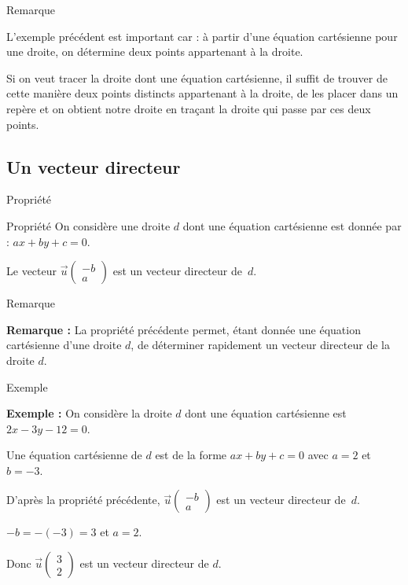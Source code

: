 \documentclass[12pt]{beamer}
\begin{document}
\begin{frame}{Remarque}

L'exemple précédent est important car : à partir d'une équation cartésienne pour une droite, on détermine deux points appartenant à la droite.

\bigskip

Si on veut tracer la droite dont une équation cartésienne, il suffit de trouver de cette manière deux points distincts appartenant à la droite, de les placer dans un repère et on obtient notre droite en traçant la droite qui passe par ces deux points. 

\end{frame}

\subsection{Un vecteur directeur}

\begin{frame}{Propriété }

\begin{exampleblock}{Propriété}
On considère une droite $d$ dont une équation cartésienne est donnée par : $ax+by+c = 0$. \par 
Le vecteur $\overrightarrow{u} \begin{pmatrix} -b \\ a \end{pmatrix}$ est un vecteur directeur de~$d$.
\end{exampleblock}

\end{frame}

\begin{frame}{Remarque}

\textbf{Remarque : } La propriété précédente permet, étant donnée une équation cartésienne d'une droite $d$, de déterminer rapidement un vecteur directeur de la droite $d$.

\end{frame}

\begin{frame}{Exemple}

\textbf{Exemple : } On considère la droite $d$ dont une équation cartésienne est $2x-3y-12=0$.

\bigskip

Une équation cartésienne de $d$ est de la forme $ax+by+c=0$ avec $a = 2$ et $b = -3$. 

\bigskip

D'après la propriété précédente, $\overrightarrow{u} \begin{pmatrix} -b \\ a \end{pmatrix}$ est un vecteur directeur de~$d$. 

\medskip

$-b = -(-3) = 3$ et $a = 2$.

\medskip

Donc $\overrightarrow{u} \begin{pmatrix} 3 \\ 2 \end{pmatrix}$ est un vecteur directeur de $d$. 


\end{frame}
\end{document}
